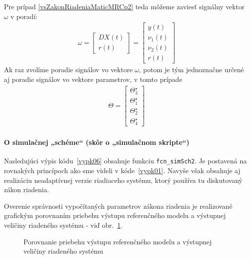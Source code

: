 \documentclass[a4paper, 10pt, ]{article}
\begin{document}
Pre prípad \eqref{vsZakonRiadeniaMaticMRCp2} teda môžeme zaviesť signálny vektor $\omega$ v poradí:
\begin{align}
    \omega =
    \begin{bmatrix}
          DX(t) \\  r(t)
    \end{bmatrix}
    =
    \begin{bmatrix}
          y(t) \\ \nu_1(t) \\ \nu_2(t) \\  r(t)
    \end{bmatrix}
\end{align}
Ak raz zvolíme poradie signálov vo vektore $\omega$, potom je tým jednoznačne určené aj poradie signálov vo vektore parametrov, v tomto prípade
\begin{align}
    \Theta =
    \begin{bmatrix}
          \Theta_3^\star \\ \Theta_1^\star \\ \Theta_2^\star \\ \Theta_4^\star
    \end{bmatrix}
\end{align}









\paragraph{O simulačnej „schéme“ (skôr o „simulačnom skripte“)}

Nasledujúci výpis kódu~\ref{vypk06} obsahuje funkciu \lstinline|fcn_simSch2|. Je postavená na rovnakých princípoch ako sme videli v kóde~\ref{vypk01}. Navyše však obsahuje aj realizáciu neadaptívnej verzie riadiaceho systému, ktorý používa tu diskutovaný zákon riadenia.

Overenie správnosti vypočítaných parametrov zákona riadenia je realizované grafickým porovnaním priebehu výstupu referenčného modelu a výstupnej veličiny riadeného systému - viď obr.~\ref{figsc_ar06_MRC_1}.




\begin{figure}[!t]
    \centering


    \caption{Porovnanie priebehu výstupu referenčného modelu a výstupnej veličiny riadeného systému}
    \label{figsc_ar06_MRC_1}

\end{figure}
\end{document}
